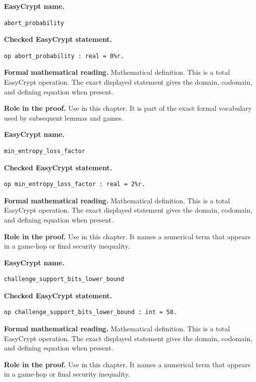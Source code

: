 \begin{formaldefinition}
\noindent\textbf{EasyCrypt name.}
\begin{lstlisting}[language=EasyCrypt,basicstyle=\ttfamily\scriptsize]
abort_probability
\end{lstlisting}
\noindent\textbf{Checked EasyCrypt statement.}
\begin{lstlisting}[language=EasyCrypt,basicstyle=\ttfamily\scriptsize]
op abort_probability : real = 0%r.
\end{lstlisting}
\noindent\textbf{Formal mathematical reading.}
Mathematical definition. This is a total EasyCrypt operation.  The exact displayed statement gives the domain, codomain, and defining equation when present.

\noindent\textbf{Role in the proof.}
Use in this chapter. It is part of the exact formal vocabulary used by subsequent lemmas and games.

\end{formaldefinition}

\begin{formaldefinition}
\noindent\textbf{EasyCrypt name.}
\begin{lstlisting}[language=EasyCrypt,basicstyle=\ttfamily\scriptsize]
min_entropy_loss_factor
\end{lstlisting}
\noindent\textbf{Checked EasyCrypt statement.}
\begin{lstlisting}[language=EasyCrypt,basicstyle=\ttfamily\scriptsize]
op min_entropy_loss_factor : real = 2%r.
\end{lstlisting}
\noindent\textbf{Formal mathematical reading.}
Mathematical definition. This is a total EasyCrypt operation.  The exact displayed statement gives the domain, codomain, and defining equation when present.

\noindent\textbf{Role in the proof.}
Use in this chapter. It names a numerical term that appears in a game-hop or final security inequality.

\end{formaldefinition}

\begin{formaldefinition}
\noindent\textbf{EasyCrypt name.}
\begin{lstlisting}[language=EasyCrypt,basicstyle=\ttfamily\scriptsize]
challenge_support_bits_lower_bound
\end{lstlisting}
\noindent\textbf{Checked EasyCrypt statement.}
\begin{lstlisting}[language=EasyCrypt,basicstyle=\ttfamily\scriptsize]
op challenge_support_bits_lower_bound : int = 58.
\end{lstlisting}
\noindent\textbf{Formal mathematical reading.}
Mathematical definition. This is a total EasyCrypt operation.  The exact displayed statement gives the domain, codomain, and defining equation when present.

\noindent\textbf{Role in the proof.}
Use in this chapter. It names a numerical term that appears in a game-hop or final security inequality.

\end{formaldefinition}

